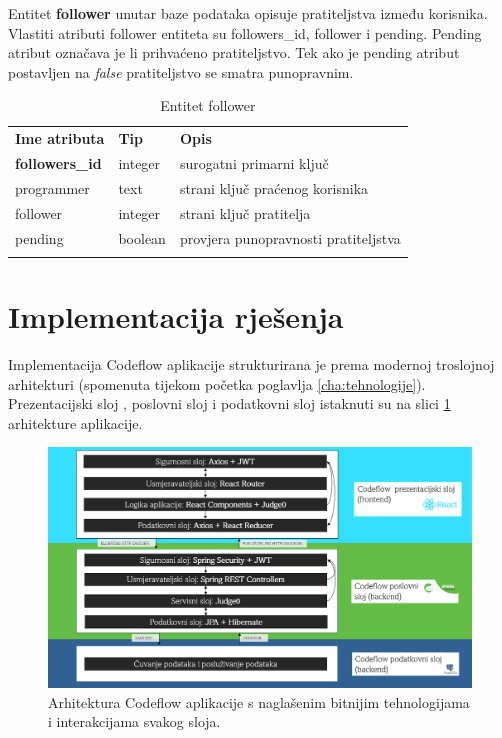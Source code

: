 \documentclass[times, utf8, zavrsni]{fer}
\begin{document}
		Entitet \textbf{follower} unutar baze podataka opisuje pratiteljstva između korisnika. Vlastiti atributi follower entiteta su followers\_id, follower i pending. Pending atribut označava je li prihvaćeno pratiteljstvo. Tek ako je pending atribut postavljen na \textit{false} pratiteljstvo se smatra punopravnim.
		\begin{table}[H]
			\caption{Entitet follower}
			\label{tbl:follower}
			\centering
			\begin{tabu} to \textwidth {XXX}
				\tabucline[1.75pt]{-}
				\textbf{Ime atributa} & \textbf{Tip} & \textbf{Opis}\\ 				
				\tabucline[1.75pt]{-}
				\textbf{followers\_id} & integer & surogatni primarni ključ\\ \hline
				programmer & text & strani ključ praćenog korisnika\\ \hline
				follower & integer & strani ključ pratitelja\\ \hline
				pending & boolean & provjera punopravnosti pratiteljstva\\ \hline
				\tabucline[1.75pt]{-}
			\end{tabu}
		\end{table}
		
		\section{Implementacija rješenja}
		Implementacija Codeflow aplikacije strukturirana je prema modernoj troslojnoj arhitekturi (spomenuta tijekom početka poglavlja \ref{cha:tehnologije}). Prezentacijski sloj , poslovni sloj i podatkovni sloj   istaknuti su na slici \ref{fig:arh} arhitekture aplikacije.
		\begin{figure}[H]
			\centering
			\includegraphics[width=\linewidth]{pictures/prikazi/Arhitektura.png}
			\caption{Arhitektura Codeflow aplikacije s naglašenim bitnijim tehnologijama i interakcijama svakog sloja.}
			\label{fig:arh}
		\end{figure}
	
\end{document}
